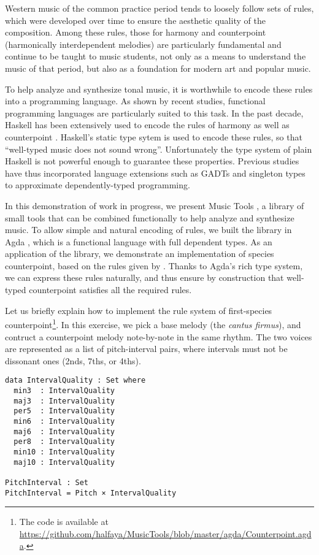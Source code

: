 \documentclass[sigplan,review]{acmart}\settopmatter{printfolios=true,printccs=false,printacmref=false}
\begin{document}
Western music of the common practice period tends to loosely
follow sets of rules, which were developed over time to ensure
the aesthetic quality of the composition. 
Among these rules, those for harmony \citep{piston1987harmony}
and counterpoint (harmonically interdependent
melodies) \citep{fux1965study} are particularly fundamental and continue
to be taught to music students,
not only as a means to understand the music of that period, but
also as a foundation for modern art and popular music.

To help analyze and synthesize tonal music, it is worthwhile to
encode these rules into a programming language. As shown by
recent studies, functional programming languages are particularly
suited to this task.
In the past decade, Haskell has been extensively used to encode
the rules of harmony \citep{fmmh, hihseufha, faamh, hafha, fghm}
as well as counterpoint \citep{szamozvancev2017well}.
Haskell's static type sytem is used to encode these rules, so that
``well-typed music does not sound wrong''.
Unfortunately the type system of plain Haskell
is not powerful enough to guarantee these properties. Previous studies
have thus incorporated language extensions such as GADTs 
\citep{cheney2002lightweight} and singleton types 
\citep{eisenberg2013dependently} to approximate dependently-typed 
programming.

In this demonstration of work in progress, we present Music Tools
\citep{MusicTools}, a library of small tools that can be combined
functionally to help analyze and synthesize music.
To allow simple and natural encoding of rules, we built the library
in Agda \citep{norellphd}, which is a functional language with full
dependent types.
As an application of the library, we demonstrate an implementation of 
species counterpoint, based on the rules given by \citet{fux1965study}.
Thanks to Agda's rich type system, we can express 
these rules naturally, and thus ensure by construction that
well-typed counterpoint satisfies all the required rules.

Let us briefly explain how to implement the rule system of 
first-species counterpoint\footnote{The code is available at
\url{https://github.com/halfaya/MusicTools/blob/master/agda/Counterpoint.agda}.}.
In this exercise, we pick a base melody (the \emph{cantus firmus}),
and contruct a counterpoint melody note-by-note in the same rhythm.
The two voices are represented as a list of pitch-interval pairs,
where intervals must not be dissonant ones (2nds, 7ths, or 4ths).

\begin{lstlisting}
data IntervalQuality : Set where
  min3  : IntervalQuality
  maj3  : IntervalQuality
  per5  : IntervalQuality
  min6  : IntervalQuality
  maj6  : IntervalQuality
  per8  : IntervalQuality
  min10 : IntervalQuality
  maj10 : IntervalQuality

PitchInterval : Set
PitchInterval = Pitch × IntervalQuality
\end{lstlisting}
\end{document}
